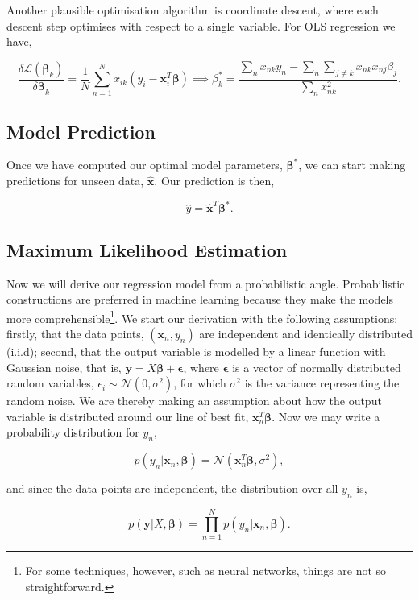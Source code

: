 \documentclass[11pt]{amsart}
\begin{document}
Another plausible optimisation algorithm is coordinate descent, where each descent step optimises with respect to a single variable. For OLS regression we have,

$$
\frac{\delta\mathcal{L}(\boldsymbol\beta_k)}{\delta\boldsymbol\beta_k} = \frac{1}{N}\sum_{n=1}^N x_{ik}(y_i - \mathbf{x}_i^T\boldsymbol\beta)
\implies \beta_k^* = \frac{\sum_n x_{nk}y_n - \sum_n\sum_{j \neq k}x_{nk} x_{nj}\beta_j}{\sum_n x_{nk}^2}.
$$

\subsection{Model Prediction}

Once we have computed our optimal model parameters, $\boldsymbol\beta^*$, we can start making predictions for unseen data, $\hat{\mathbf{x}}$. Our prediction is then,

$$\hat{y} = \hat{\mathbf{x}}^T\boldsymbol\beta^*.$$

\subsection{Maximum Likelihood Estimation}

Now we will derive our regression model from a probabilistic angle. Probabilistic constructions are preferred in machine learning because they make the models more comprehensible\footnote{For some techniques, however, such as neural networks, things are not so straightforward.}. We start our derivation with the following assumptions: firstly, that the data points, $(\mathbf{x}_n, y_n)$ are independent and identically distributed (i.i.d); second, that the output variable is modelled by a linear function with Gaussian noise, that is, $\mathbf{y} = X\boldsymbol\beta + \boldsymbol\epsilon$, where $\boldsymbol\epsilon$ is a vector of normally distributed random variables, $\epsilon_i \sim \mathcal{N}(0, \sigma^2)$, for which $\sigma^2$ is the variance representing the random noise. We are thereby making an assumption about how the output variable is distributed around our line of best fit, $\mathbf{x}_n^T\boldsymbol\beta$. Now we may write a probability distribution for $y_n$,

$$p(y_n|\mathbf{x}_n, \boldsymbol\beta) = \mathcal{N}(\mathbf{x}_n^T\boldsymbol\beta, \sigma^2),$$

and since the data points are independent, the distribution over all $y_n$ is,

$$p(\mathbf{y}|X, \boldsymbol\beta) = \prod_{n=1}^N p(y_n|\mathbf{x}_n, \boldsymbol\beta).$$
\end{document}
